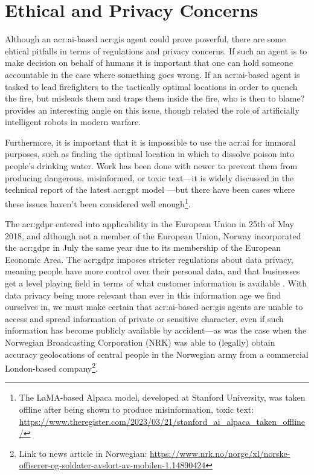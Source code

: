 \section{Ethical and Privacy Concerns}\label{sec:regulatory-bodies-and-privacy-concerns}

Although an \acrshort{acr:ai}-based \acrshort{acr:gis} agent could prove powerful, there are some ehtical pitfalls in terms of regulations and privacy concerns. If such an agent is to make decision on behalf of humans it is important that one can hold someone accountable in the case where something goes wrong. If an \acrshort{acr:ai}-based agent is tasked to lead firefighters to the tactically optimal locations in order to quench the fire, but misleads them and traps them inside the fire, who is then to blame? \cite{sparrowKillerRobots2007} provides an interesting angle on this issue, though related the role of artificially intelligent robots in modern warfare.

Furthermore, it is important that it is impossible to use the \acrshort{acr:ai} for immoral purposes, such as finding the optimal location in which to dissolve poison into people's drinking water. Work has been done with newer  to prevent them from producing dangerous, misinformed, or toxic text---it is widely discussed in the technical report of the latest \acrshort{acr:gpt} model \citep[11-14]{openaiGPT4TechnicalReport2023}---but there have been cases where these issues haven't been considered well enough\footnote{The LaMA-based Alpaca model, developed at Stanford University, was taken offline after being shown to produce misinformation, toxic text: \url{https://www.theregister.com/2023/03/21/stanford_ai_alpaca_taken_offline/}}.

The \gls{acr:gdpr} entered into applicability in the European Union in 25th of May 2018, and although not a member of the European Union, Norway incorporated the \gls{acr:gdpr} in July the same year due to its membership of the European Economic Area. The \gls{acr:gdpr} imposes stricter regulations about data privacy, meaning people have more control over their personal data, and that businesses get a level playing field in terms of what customer information is available \citep{datatilsynetGeneralDataProtection}. With data privacy being more relevant than ever in this information age we find ourselves in, we must make certain that \acrshort{acr:ai}-based \acrshort{acr:gis} agents are unable to access and spread information of private or sensitive character, even if such information has become publicly available by accident---as was the case when the Norwegian Broadcasting Corporation (NRK) was able to (legally) obtain accuracy geolocations of central people in the Norwegian army from a commercial London-based company\footnote{Link to news article in Norwegian: \url{https://www.nrk.no/norge/xl/norske-offiserer-og-soldater-avslort-av-mobilen-1.14890424}}.

\glsresetall